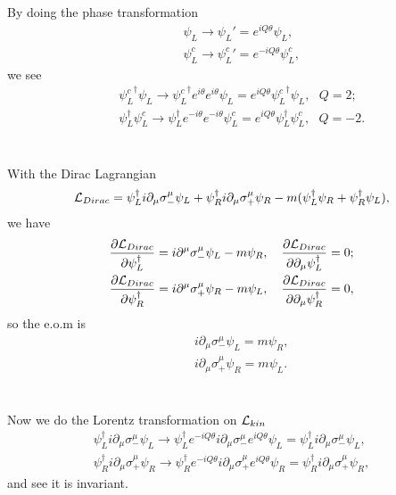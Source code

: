 \documentclass[11pt]{article}
\def\del{{\partial}}
\begin{document}
\section{ }
By doing the phase transformation
\begin{eqnarray}
    && \psi_L   \to \psi_L'   = e^{ iQ\theta} \psi_L,    \\
    && \psi_L^c \to {\psi_L^c}' = e^{-iQ\theta} \psi_L^c , 
\end{eqnarray}
we see
\begin{eqnarray}
    &&{\psi_L^c}^\dagger \psi_L \to {\psi_L^c}^\dagger e^{i\theta} e^{i\theta} \psi_L = e^{ iQ\theta} {\psi_L^c}^\dagger \psi_L, ~~~Q=2;\\ 
    &&\psi_L^\dagger {\psi_L^c}  \to \psi_L^\dagger e^{-i\theta} e^{-i\theta} {\psi_L^c} = e^{ iQ\theta} \psi_L^\dagger {\psi_L^c}, ~~~Q=-2.
\end{eqnarray}

\section{ }
With the Dirac Lagrangian
\begin{eqnarray}
    {\cal L}_{Dirac} = \psi_L^\dagger i\del_\mu \sigma_-^\mu \psi_L
    + \psi_R^\dagger i\del_\mu \sigma_+^\mu \psi_R -m (\psi_L^\dagger \psi_R + \psi_R^\dagger \psi_L), 
\end{eqnarray}
we have
\begin{eqnarray}
    \frac{\del {\cal L}_{Dirac} }{\del \psi_L^\dagger } = i\del^\mu \sigma_-^\mu \psi_L -m \psi_R, ~~~ \frac{\del {\cal L}_{Dirac} }{\del \del_\mu \psi_L^\dagger }=0; \\
    \frac{\del {\cal L}_{Dirac} }{\del \psi_R^\dagger } = i\del^\mu \sigma_+^\mu \psi_R -m \psi_L, ~~~ \frac{\del {\cal L}_{Dirac} }{\del \del_\mu \psi_R^\dagger }=0,
\end{eqnarray}
so the e.o.m is
\begin{eqnarray}
    &&i\del_\mu \sigma_-^\mu \psi_L = m \psi_R ,  \\
    && i\del_\mu \sigma_+^\mu \psi_R = m \psi_L .
\end{eqnarray}

\section{ }
Now we do the Lorentz transformation on ${\cal L}_{kin}$ 
\begin{eqnarray}
    \psi_L^\dagger i \del_\mu \sigma_-^\mu \psi_L \to \psi_L^\dagger e^{-iQ\theta} i \del_\mu \sigma_-^\mu e^{iQ\theta} \psi_L =\psi_L^\dagger i \del_\mu \sigma_-^\mu \psi_L, \\
    \psi_R^\dagger i \del_\mu \sigma_+^\mu \psi_R \to \psi_R^\dagger e^{-iQ\theta} i \del_\mu \sigma_+^\mu e^{iQ\theta} \psi_R =\psi_R^\dagger i \del_\mu \sigma_+^\mu \psi_R,
\end{eqnarray}
and see it is invariant.
\end{document}
